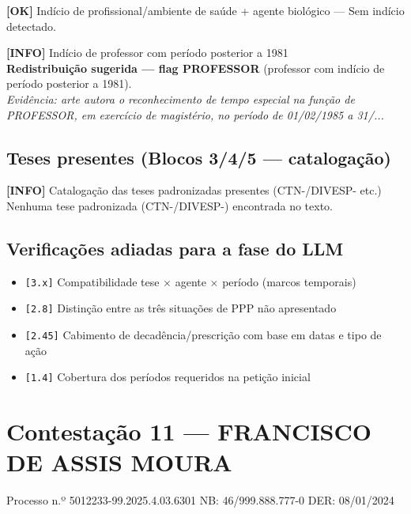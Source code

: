 \documentclass[12pt,a4paper]{article}
\newcommand{\statusOK}[1]{\textcolor{corOK}{\textbf{[OK]}} #1}
\newcommand{\statusINFO}[1]{\textcolor{corINFO}{\textbf{[INFO]}} #1}
\begin{document}
\medskip
\statusOK{Indício de profissional/ambiente de saúde + agente biológico} --- Sem indício detectado.

\medskip
\statusINFO{Indício de professor com período posterior a 1981}\\
\textcolor{corVERIFICAR}{\textbf{Redistribuição sugerida --- flag PROFESSOR}} (professor com indício de período posterior a 1981).
\\
\textit{Evidência: arte autora o reconhecimento de tempo especial na função de PROFESSOR, em exercício de magistério, no período de 01/02/1985 a 31/...}

\subsection{Teses presentes (Blocos 3/4/5 --- catalogação)}

\statusINFO{Catalogação das teses padronizadas presentes (CTN-/DIVESP- etc.)}\\
Nenhuma tese padronizada (CTN-/DIVESP-) encontrada no texto.

\subsection{Verificações adiadas para a fase do LLM}

\begin{itemize}
  \item \texttt{[3.x]} Compatibilidade tese × agente × período (marcos temporais)
  \item \texttt{[2.8]} Distinção entre as três situações de PPP não apresentado
  \item \texttt{[2.45]} Cabimento de decadência/prescrição com base em datas e tipo de ação
  \item \texttt{[1.4]} Cobertura dos períodos requeridos na petição inicial
\end{itemize}



\clearpage
{}
\section{Contestação 11 --- FRANCISCO DE ASSIS MOURA}
\begin{center}
  {\small Processo n.º 5012233-99.2025.4.03.6301 \quad NB: 46/999.888.777-0 \quad DER: 08/01/2024}
\end{center}
\end{document}
